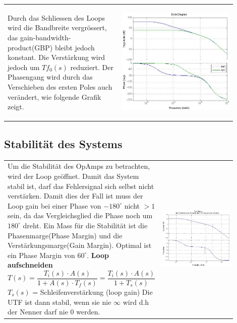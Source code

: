 \begin{tabular}{m{0.45\linewidth}m{0.45\linewidth}}
	Durch das Schliessen des Loops wird die Bandbreite vergrössert, das gain-bandwidth-product(GBP) bleibt jedoch konstant. Die Verstärkung wird jedoch um $Tf_0(s)$ reduziert. Der Phasengang wird durch das Verschieben des ersten Poles auch verändert, wie folgende Grafik zeigt.
	& \begin{center}
        \includegraphics[width=6.7cm, valign=t]{./pictures/AolAcl.png}
    \end{center}
\end{tabular}
\vspace{-7mm}
\subsection{Stabilität des Systems}
\begin{tabular}{m{0.45\linewidth}m{0.45\linewidth}}
    Um die Stabilität des OpAmps zu betrachten, wird der Loop geöffnet. Damit das System stabil ist, darf das       
    Fehlersignal sich selbst nicht verstärken. Damit dies der Fall ist muss der Loop gain bei einer Phase von $-180^\circ$
    nicht $>1$ sein, da das Vergleichsglied die Phase noch um $180^\circ$ dreht. Ein Mass für die Stabilität ist die 
    Phasenmarge(Phase Margin) und die Verstärkungsmarge(Gain Margin). Optimal ist ein Phase Margin von $60^{\circ}$.
    \newline
    \textbf{Loop aufschneiden} \newline
    $T(s) = \dfrac{T_i(s) \cdot A(s)}{1+A(s) \cdot T_f(s)} = \dfrac{T_i(s) \cdot A(s)}{1+T_s(s)}$ \newline
    $T_s(s)$ = Schleifenverstärkung (loop gain) \newline
    Die UTF ist dann stabil, wenn sie nie $\infty$ wird d.h der Nenner darf nie 0 werden.
    & \begin{center}
        \includegraphics[width=6.7cm, valign=t]{./pictures/margins.png}
    \end{center}
\end{tabular}

